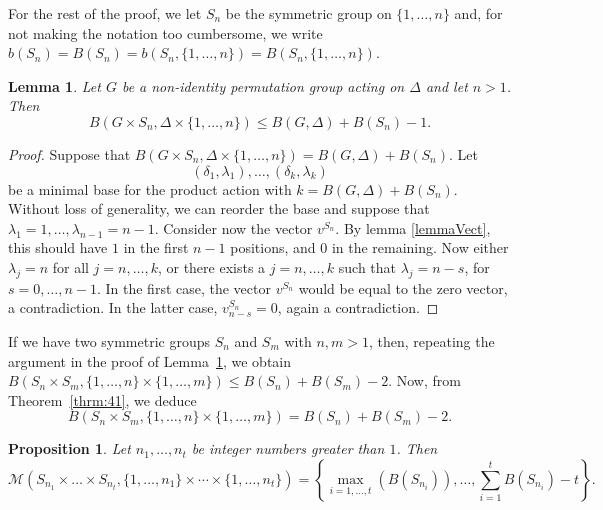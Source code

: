 \documentclass{amsart}
\newtheorem{proposition}[theorem]{Proposition}
\newtheorem{lemma}[theorem]{Lemma}
\begin{document}
For the rest of the proof, we let $S_n$ be the symmetric group on $\{1,\ldots,n\}$ and, for not making the notation too cumbersome, we write $b(S_n)=B(S_n)=b(S_n,\{1,\ldots,n\})=B(S_n,\{1,\ldots,n\})$.	
	\begin{lemma}\label{ProdSym}
		Let $G$ be a non-identity permutation group acting on $\Delta$ and let $n>1$. Then
		\[
			B(G\times S_n,\Delta\times \{1,\dots,n\}) \leq B(G,\Delta) + B(S_n) -1.
		\]
	\end{lemma}
	\begin{proof}
		Suppose that $B(G \times S_n,\Delta\times \{1,\dots,n\}) = B(G,\Delta)+ B(S_n)$. Let
		\[
		(\delta_1,\lambda_1),\dots, (\delta_k,\lambda_k)
		\] 
		 be a minimal base for the product action with $k=B(G,\Delta)+ B(S_n)$.
		Without loss of generality, we can reorder the base and suppose that $\lambda_1 = 1, \dots, \lambda_{n-1} = n-1$.
		Consider now the vector $v^{S_{n}}$. By lemma \ref{lemmaVect}, this should have $1$ in the first $n-1$ positions, and $0$ in the remaining. Now either $\lambda_j = n$ for all $j=n,\dots, k$, or there exists a $j=n,\dots,k$ such that $\lambda_j = n-s$, for $s=0,\dots, n-1$. In the first case, the vector $v^{S_{n}}$ would be equal to the zero vector, a contradiction. In the latter case, $v^{S_{n}}_{n-s}=0$, again a contradiction. 
	\end{proof}
	If we have two symmetric groups $S_{n}$ and $S_{m}$ with $n,m>1$, then, repeating the argument in the proof of Lemma~\ref{ProdSym}, we obtain  
	$B(S_{n}\times S_m,\{1,\dots,n \} \times \{1,\dots,m\}) \leq B(S_n) + B(S_m) -2.$
Now, from Theorem~\ref{thrm:41}, we deduce
$$B(S_{n}\times S_m,\{1,\dots,n \} \times \{1,\dots,m\})= B(S_n) + B(S_m) -2.$$
	\begin{proposition}\label{prodSym}
		Let $n_1, \dots, n_t$ be integer numbers greater than $1$. Then
		\[
			\mathcal{M}(S_{n_1}\times \dots \times S_{n_t},\{1,\ldots,n_1\}\times\cdots\times\{1,\ldots,n_t\})=\left\{\max_{i=1,\dots,t}(B(S_{n_i})), \dots, \sum_{i=1}^{t}B(S_{n_i})-t\right\}.
		\]
	\end{proposition}
\end{document}
